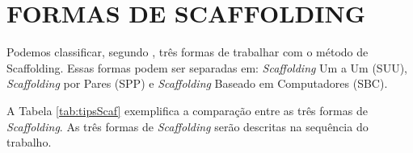 \section{FORMAS DE SCAFFOLDING}

Podemos classificar, segundo , três formas de trabalhar com o método de Scaffolding. Essas formas podem ser separadas em: \textit{Scaffolding} Um a Um (SUU), \textit{Scaffolding} por Pares (SPP) e \textit{Scaffolding} Baseado em Computadores (SBC). 

A Tabela \ref{tab:tipsScaf} exemplifica a comparação entre as três formas de \textit{Scaffolding}. As três formas de \textit{Scaffolding} serão descritas na sequência do trabalho. 

